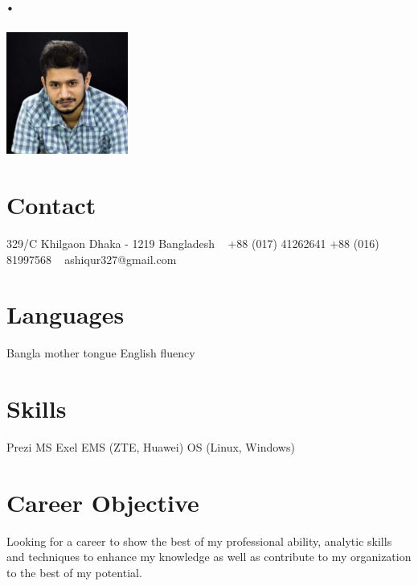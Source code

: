 \documentclass[]{cv-style} %
\begin{document}
\begin{aside}
\section{.}
\includegraphics[width=4cm]{2016}
\section{Contact}
329/C Khilgaon
Dhaka - 1219
Bangladesh
~
+88 (017) 41262641
+88 (016) 81997568
~
ashiqur327@gmail.com
\section{Languages}
Bangla mother tongue
English fluency
\section{Skills}
Prezi
MS Exel
EMS (ZTE, Huawei)
OS (Linux, Windows)
\end{aside}
\section{Career Objective}
  \vspace{-0.2cm}
Looking for a career to show the best of my professional ability, analytic skills and techniques to enhance my knowledge as well as contribute to my organization to the best of my potential.
\end{document}
